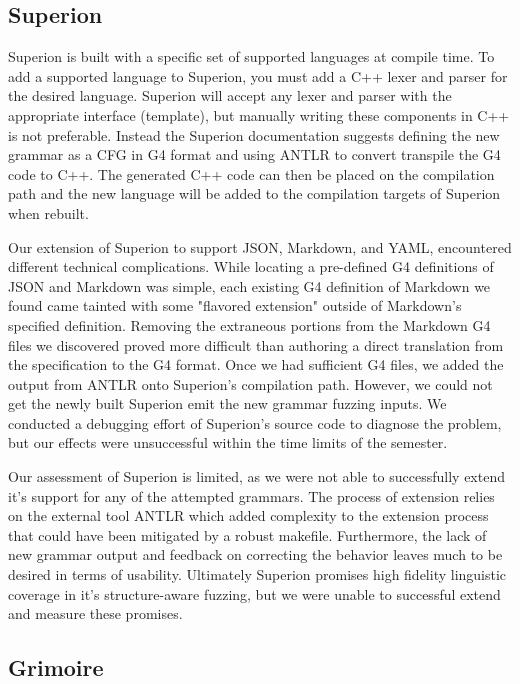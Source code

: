 \documentclass[12pt]{diazessay}
\begin{document}
\subsection*{Superion}

Superion is built with a specific set of supported languages at compile time.
To add a supported language to Superion, you must add a C++ lexer and parser for the desired language.
Superion will accept any lexer and parser with the appropriate interface (template), but manually writing these components in C++ is not preferable.
Instead the Superion documentation suggests defining the new grammar as a CFG in G4 format and using ANTLR\cite{parr2013definitive} to convert transpile the G4 code to C++.
The generated C++ code can then be placed on the compilation path and the new language will be added to the compilation targets of Superion when rebuilt.

Our extension of Superion to support JSON, Markdown, and YAML, encountered different technical complications.
While locating a pre-defined G4 definitions of JSON and Markdown was simple, each existing G4 definition of Markdown we found came tainted with some "flavored extension" outside of Markdown's specified definition.
Removing the extraneous portions from the Markdown G4 files we discovered proved more difficult than authoring a direct translation from the specification to the G4 format.
Once we had sufficient G4 files, we added the output from ANTLR onto Superion's compilation path.
However, we could not get the newly built Superion emit the new grammar fuzzing inputs.
We conducted a debugging effort of Superion's source code to diagnose the problem, but our effects were unsuccessful within the time limits of the semester.

Our assessment of Superion is limited, as we were not able to successfully extend it's support for any of the attempted grammars.
The process of extension relies on the external tool ANTLR which added complexity to the extension process that could have been mitigated by a robust makefile.
Furthermore, the lack of new grammar output and feedback on correcting the behavior leaves much to be desired in terms of usability.
Ultimately Superion promises high fidelity linguistic coverage in it's structure-aware fuzzing, but we were unable to successful extend and measure these promises.

\subsection*{Grimoire}
\end{document}
